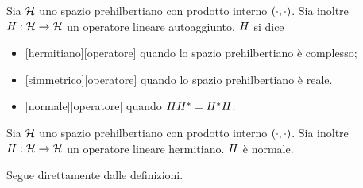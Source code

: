 \begin{Definition}
  Sia $\mathcal{H}$ uno spazio prehilbertiano con prodotto interno
  $\left ( \cdot , \cdot \right )$.
  Sia inoltre
  $H: \mathcal{H} \rightarrow \mathcal{H}$
  un operatore lineare autoaggiunto.
  $H$ si dice
  \begin{itemize}
    \item {}[hermitiano][operatore] quando lo spazio
          prehilbertiano \`e complesso;
    \item {}[simmetrico][operatore] quando lo spazio
          prehilbertiano \`e reale.
    \item {}[normale][operatore] quando
          $H{H}^*
            = {H}^*H$.
  \end{itemize}
\end{Definition}
\begin{Theorem}
  Sia $\mathcal{H}$ uno spazio prehilbertiano con prodotto interno
  $\left ( \cdot , \cdot \right )$.
  Sia inoltre
  $H: \mathcal{H} \rightarrow \mathcal{H}$
  un operatore lineare hermitiano.
  $H$ \`e normale.
\end{Theorem}
\Proof Segue direttamente dalle definizioni. \EndProof
